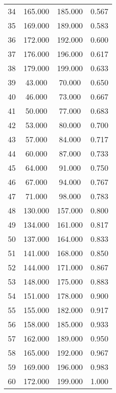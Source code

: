 \begin{tabular}{cccc}
  34 & 165.000 & 185.000 & 0.567 \\ 
  35 & 169.000 & 189.000 & 0.583 \\ 
  36 & 172.000 & 192.000 & 0.600 \\ 
  37 & 176.000 & 196.000 & 0.617 \\ 
  38 & 179.000 & 199.000 & 0.633 \\ 
  39 & 43.000 & 70.000 & 0.650 \\ 
  40 & 46.000 & 73.000 & 0.667 \\ 
  41 & 50.000 & 77.000 & 0.683 \\ 
  42 & 53.000 & 80.000 & 0.700 \\ 
  43 & 57.000 & 84.000 & 0.717 \\ 
  44 & 60.000 & 87.000 & 0.733 \\ 
  45 & 64.000 & 91.000 & 0.750 \\ 
  46 & 67.000 & 94.000 & 0.767 \\ 
  47 & 71.000 & 98.000 & 0.783 \\ 
  48 & 130.000 & 157.000 & 0.800 \\ 
  49 & 134.000 & 161.000 & 0.817 \\ 
  50 & 137.000 & 164.000 & 0.833 \\ 
  51 & 141.000 & 168.000 & 0.850 \\ 
  52 & 144.000 & 171.000 & 0.867 \\ 
  53 & 148.000 & 175.000 & 0.883 \\ 
  54 & 151.000 & 178.000 & 0.900 \\ 
  55 & 155.000 & 182.000 & 0.917 \\ 
  56 & 158.000 & 185.000 & 0.933 \\ 
  57 & 162.000 & 189.000 & 0.950 \\ 
  58 & 165.000 & 192.000 & 0.967 \\ 
  59 & 169.000 & 196.000 & 0.983 \\ 
  60 & 172.000 & 199.000 & 1.000 \\ 
   \hline
\end{tabular}
